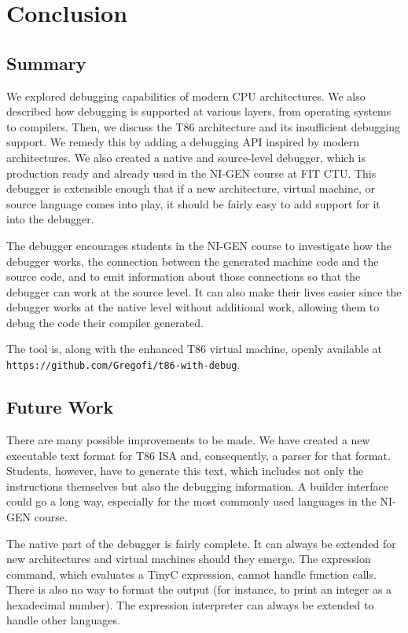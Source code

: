\chapter{Conclusion}
\section{Summary}
We explored debugging capabilities of modern CPU architectures. We also
described how debugging is supported at various layers, from operating systems
to compilers. Then, we discuss the T86 architecture and its insufficient
debugging support. We remedy this by adding a debugging API inspired by modern
architectures. We also created a native and source-level debugger, which is
production ready and already used in the NI-GEN course at FIT CTU. This
debugger is extensible enough that if a new architecture, virtual machine, or
source language comes into play, it should be fairly easy to add support for it
into the debugger.

The debugger encourages students in the NI-GEN course to investigate how the
debugger works, the connection between the generated machine code and the
source code, and to emit information about those connections so that the
debugger can work at the source level. It can also make their lives easier
since the debugger works at the native level without additional work, allowing
them to debug the code their compiler generated.

The tool is, along with the enhanced T86 virtual machine, openly available at \\  
\verb|https://github.com/Gregofi/t86-with-debug|.

\section{Future Work}
There are many possible improvements to be made. We have created a new
executable text format for T86 ISA and, consequently, a parser for that format.
Students, however, have to generate this text, which includes not only the
instructions themselves but also the debugging information. A builder interface
could go a long way, especially for the most commonly used languages in the
NI-GEN course.

The native part of the debugger is fairly complete. It can always be extended
for new architectures and virtual machines should they emerge. The expression
command, which evaluates a TinyC expression, cannot handle function calls.
There is also no way to format the output (for instance, to print an integer as
a hexadecimal number). The expression interpreter can always be extended to
handle other languages.

